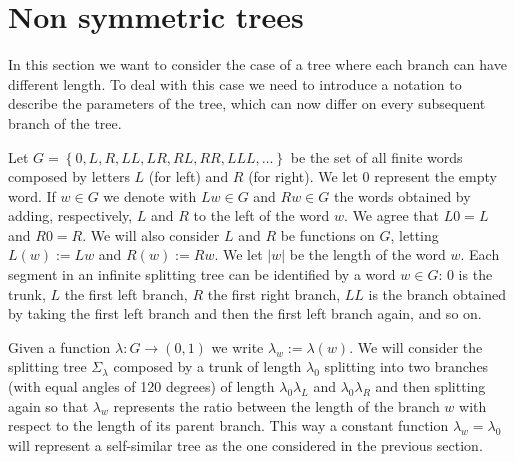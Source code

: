 \documentclass{amsart}
\newcommand{\abs}[1]{\left\vert #1 \right\vert}
\newcommand{\ENCLOSE}[1]{\left\{#1\right\}}
\theoremstyle{definition}
\theoremstyle{remark}
\begin{document}

\section{Non symmetric trees}

In this section we want to consider the case of a tree where each branch can have different length.
To deal with this case we need to introduce a notation to describe the parameters of the tree, which 
can now differ on every subsequent branch of the tree.

Let $G=\ENCLOSE{0,L,R,LL,LR,RL,RR,LLL,\dots}$ be the set of all finite words composed by letters 
$L$ (for left) and $R$ (for right). We let $0$ represent the empty word.
If $w\in G$ we denote with $Lw\in G$ and $Rw\in G$ the words obtained by adding, 
respectively, $L$ and $R$ to the left of the word $w$.
We agree that $L0=L$ and $R0=R$.
We will also consider $L$ and $R$ be functions on $G$, letting $L(w):=Lw$ and $R(w):=Rw$.
We let $\abs{w}$ be the length of the word $w$.
Each segment in an infinite splitting tree can be identified by a word $w\in G$:
$0$ is the trunk, $L$ the first left branch, $R$ the first right branch, $LL$ is the branch obtained by taking
the first left branch and then the first left branch again, and so on.

Given a function $\mathbb \lambda\colon G\to (0,1)$ we write $\lambda_w:=\lambda(w)$.
We will consider the splitting tree $\Sigma_\lambda$ composed by a trunk of length $\lambda_0$ splitting 
into two branches (with equal angles of 120 degrees) of length $\lambda_0\lambda_L$ and $\lambda_0\lambda_R$
and then splitting again so that $\lambda_w$ represents the ratio between the length of the branch $w$ with respect 
to the length of its parent branch. 
This way a constant function $\lambda_w = \lambda_0$ will represent a self-similar tree as the one considered in the previous section.
\end{document}

